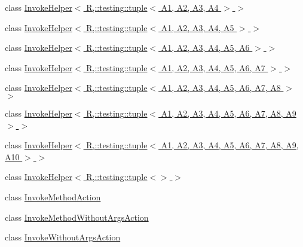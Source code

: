 \begin{DoxyCompactItemize}
\item 
class \hyperlink{classtesting_1_1internal_1_1_invoke_helper_3_01_r_00_1_1testing_1_1tuple_3_01_a1_00_01_a2_00_01_a3_00_01_a4_01_4_01_4}{Invoke\+Helper$<$ R,\+::testing\+::tuple$<$ A1, A2, A3, A4 $>$ $>$}
\item 
class \hyperlink{classtesting_1_1internal_1_1_invoke_helper_3_01_r_00_1_1testing_1_1tuple_3_01_a1_00_01_a2_00_01_a3_00_01_a4_00_01_a5_01_4_01_4}{Invoke\+Helper$<$ R,\+::testing\+::tuple$<$ A1, A2, A3, A4, A5 $>$ $>$}
\item 
class \hyperlink{classtesting_1_1internal_1_1_invoke_helper_3_01_r_00_1_1testing_1_1tuple_3_01_a1_00_01_a2_00_01_6f3c1b6c3435aa3488b058deeeb8a74f}{Invoke\+Helper$<$ R,\+::testing\+::tuple$<$ A1, A2, A3, A4, A5, A6 $>$ $>$}
\item 
class \hyperlink{classtesting_1_1internal_1_1_invoke_helper_3_01_r_00_1_1testing_1_1tuple_3_01_a1_00_01_a2_00_01_afc7fa334bddd6bdae263bb7183b22d4}{Invoke\+Helper$<$ R,\+::testing\+::tuple$<$ A1, A2, A3, A4, A5, A6, A7 $>$ $>$}
\item 
class \hyperlink{classtesting_1_1internal_1_1_invoke_helper_3_01_r_00_1_1testing_1_1tuple_3_01_a1_00_01_a2_00_01_e6fe94962f933bc582acd55e0092e60f}{Invoke\+Helper$<$ R,\+::testing\+::tuple$<$ A1, A2, A3, A4, A5, A6, A7, A8 $>$ $>$}
\item 
class \hyperlink{classtesting_1_1internal_1_1_invoke_helper_3_01_r_00_1_1testing_1_1tuple_3_01_a1_00_01_a2_00_01_54a05d3b1a768be53cb8b099dc24ceaa}{Invoke\+Helper$<$ R,\+::testing\+::tuple$<$ A1, A2, A3, A4, A5, A6, A7, A8, A9 $>$ $>$}
\item 
class \hyperlink{classtesting_1_1internal_1_1_invoke_helper_3_01_r_00_1_1testing_1_1tuple_3_01_a1_00_01_a2_00_01_10b1582d97e7947a00193b033e4526b3}{Invoke\+Helper$<$ R,\+::testing\+::tuple$<$ A1, A2, A3, A4, A5, A6, A7, A8, A9, A10 $>$ $>$}
\item 
class \hyperlink{classtesting_1_1internal_1_1_invoke_helper_3_01_r_00_1_1testing_1_1tuple_3_4_01_4}{Invoke\+Helper$<$ R,\+::testing\+::tuple$<$$>$ $>$}
\item 
class \hyperlink{classtesting_1_1internal_1_1_invoke_method_action}{Invoke\+Method\+Action}
\item 
class \hyperlink{classtesting_1_1internal_1_1_invoke_method_without_args_action}{Invoke\+Method\+Without\+Args\+Action}
\item 
class \hyperlink{classtesting_1_1internal_1_1_invoke_without_args_action}{Invoke\+Without\+Args\+Action}
\item 

\end{DoxyCompactItemize}
